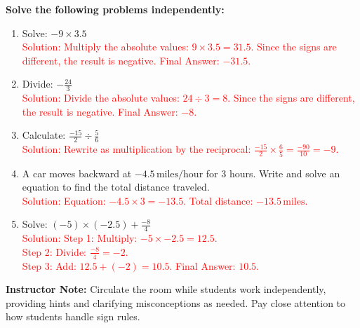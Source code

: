 \documentclass[11pt]{article}
\begin{document}
\begin{tcolorbox}[colframe=black!60, colback=white, 
coltitle=black, colbacktitle=black!15, fonttitle=\bfseries\Large, 
title=Independent Practice, halign title=center, left=10pt, right=10pt, top=10pt, bottom=15pt]
\textbf{Solve the following problems independently:}
\begin{enumerate}[itemsep=5em]
    \item Solve: \( -9 \times 3.5 \) \\
    \textcolor{red}{Solution: Multiply the absolute values: \( 9 \times 3.5 = 31.5 \). Since the signs are different, the result is negative. Final Answer: \( -31.5 \).}
    \item Divide: \( -\frac{24}{3} \) \\
    \textcolor{red}{Solution: Divide the absolute values: \( 24 \div 3 = 8 \). Since the signs are different, the result is negative. Final Answer: \( -8 \).}
    \item Calculate: \( \frac{-15}{2} \div \frac{5}{6} \) \\
    \textcolor{red}{Solution: Rewrite as multiplication by the reciprocal: \( \frac{-15}{2} \times \frac{6}{5} = \frac{-90}{10} = -9 \).}
    \item A car moves backward at \( -4.5 \, \text{miles/hour} \) for 3 hours. Write and solve an equation to find the total distance traveled. \\
    \textcolor{red}{Solution: Equation: \( -4.5 \times 3 = -13.5 \). Total distance: \( -13.5 \, \text{miles} \).}
    \item Solve: \( (-5) \times (-2.5) + \frac{-8}{4} \) \\
    \textcolor{red}{Solution: Step 1: Multiply: \( -5 \times -2.5 = 12.5 \). \\ 
    Step 2: Divide: \( \frac{-8}{4} = -2 \). \\ 
    Step 3: Add: \( 12.5 + (-2) = 10.5 \). Final Answer: \( 10.5 \).}
\end{enumerate}

{\color{blue} \textbf{Instructor Note:} Circulate the room while students work independently, providing hints and clarifying misconceptions as needed. Pay close attention to how students handle sign rules.}
\end{tcolorbox}

\vspace{1em}
\end{document}
